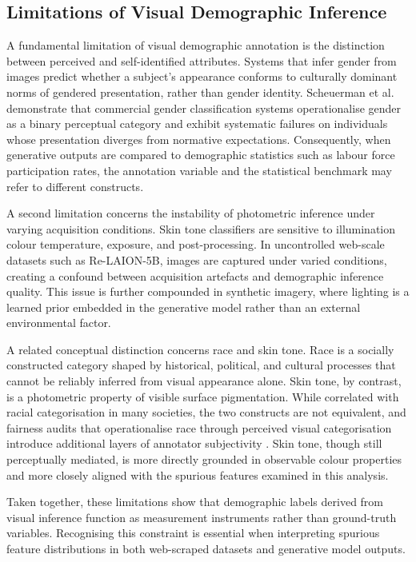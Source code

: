 \subsection{Limitations of Visual Demographic Inference}
\label{subsec:demographic_limitations}

A fundamental limitation of visual demographic annotation is the distinction between perceived and self-identified attributes. Systems that infer gender from images predict whether a subject's appearance conforms to culturally dominant norms of gendered presentation, rather than gender identity. Scheuerman et al.~\cite{Scheuerman_2019_HowComputersSeeGender} demonstrate that commercial gender classification systems operationalise gender as a binary perceptual category and exhibit systematic failures on individuals whose presentation diverges from normative expectations. Consequently, when generative outputs are compared to demographic statistics such as labour force participation rates, the annotation variable and the statistical benchmark may refer to different constructs.

A second limitation concerns the instability of photometric inference under varying acquisition conditions. Skin tone classifiers are sensitive to illumination colour temperature, exposure, and post-processing. In uncontrolled web-scale datasets such as Re-LAION-5B, images are captured under varied conditions, creating a confound between acquisition artefacts and demographic inference quality. This issue is further compounded in synthetic imagery, where lighting is a learned prior embedded in the generative model rather than an external environmental factor.

A related conceptual distinction concerns race and skin tone. Race is a socially constructed category shaped by historical, political, and cultural processes that cannot be reliably inferred from visual appearance alone. Skin tone, by contrast, is a photometric property of visible surface pigmentation. While correlated with racial categorisation in many societies, the two constructs are not equivalent, and fairness audits that operationalise race through perceived visual categorisation introduce additional layers of annotator subjectivity \cite{Raji_2019_ActionableAuditing}. Skin tone, though still perceptually mediated, is more directly grounded in observable colour properties and more closely aligned with the spurious features examined in this analysis.

Taken together, these limitations show that demographic labels derived from visual inference function as measurement instruments rather than ground-truth variables. Recognising this constraint is essential when interpreting spurious feature distributions in both web-scraped datasets and generative model outputs.

